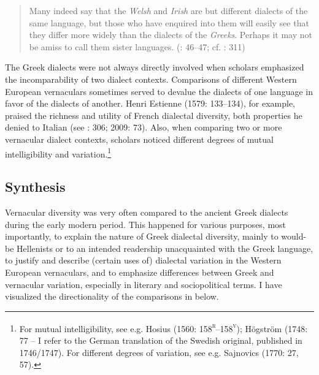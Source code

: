 \begin{quote}
Many indeed say that the \textit{Welsh} and \textit{Irish} are but different dialects of the same language, but those who have enquired into them will easily see that they differ more widely than the dialects of the \textit{Greeks}. Perhaps it may not be amiss to call them sister languages. (\citealt{Malcolm1738}: 46–47; cf. \citealt{MacNicol1779}: 311)
\end{quote}

The Greek dialects were not always directly involved when scholars emphasized the incomparability of two dialect contexts. Comparisons of different Western European vernaculars sometimes served to devalue the dialects of one language in favor of the dialects of another. Henri Estienne (1579: 133–134), for example, praised the richness and utility of French dialectal diversity, both properties he denied to Italian (see \citealt{Swiggers1997}: 306; 2009: 73). Also, when comparing two or more vernacular dialect contexts, scholars noticed different degrees of mutual intelligibility and variation.\footnote{For mutual intelligibility, see e.g. Hosius (1560: 158\textsc{\textsuperscript{r}}\textsc{–158}\textsc{\textsuperscript{v}}); Högström (1748: 77 – I refer to the German translation of the Swedish original, published in 1746/1747). For different degrees of variation, see e.g. Sajnovics (1770: 27, 57).}

\subsection{Synthesis}

Vernacular diversity was very often compared to the ancient Greek dialects during the early modern period. This happened for various purposes, most importantly,  to explain the nature of Greek dialectal diversity, mainly to would-be Hellenists or to an intended readership unacquainted with the Greek language,  to justify and describe (certain uses of) dialectal variation in the Western European vernaculars, and  to emphasize differences between Greek and vernacular variation, especially in literary and sociopolitical terms. I have visualized the directionality of the comparisons in  below.

